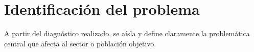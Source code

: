 \section{Identificación del problema}
\label{sec:identificacion_problema}
A partir del diagnóstico realizado, se aísla y define claramente la problemática central que afecta al sector o población objetivo.
